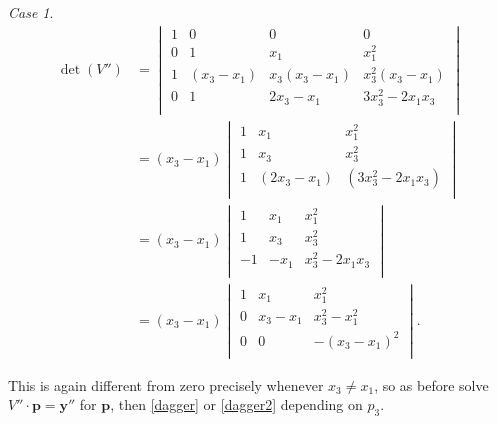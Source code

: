 \documentclass[english,11pt,a4paper]{article}
\theoremstyle{definition}
\theoremstyle{remark}
\theoremstyle{case}
\newtheorem{case}{Case}
\begin{document}
\begin{case}
		\begin{align*}\det (V'') &= 
		\begin{vmatrix}
			1 & 0 & 0 & 0\\
			0 & 1 & x_1 & x_1^2\\
			1 & (x_3-x_1) & x_3(x_3-x_1) & x_3^2(x_3-x_1)\\
			0 & 1 & 2x_3 - x_1 & 3x_3^2-2x_1x_3\\
		\end{vmatrix}
		\\
		&= (x_3-x_1)
		\begin{vmatrix}
			1 & x_1 & x_1^2\\
			1 & x_3 & x_3^2\\
			1 & (2x_3 - x_1) & (3x_3^2-2x_1x_3)\\
		\end{vmatrix}
		\\
		&= (x_3-x_1)
		\begin{vmatrix}
			1 & x_1 & x_1^2\\
			1 & x_3 & x_3^2\\
			-1 & - x_1 & x_3^2-2x_1 x_3\\
		\end{vmatrix}
		\\		
		&= (x_3-x_1)
		\begin{vmatrix}
			1 & x_1 & x_1^2\\
			0 & x_3-x_1 & x_3^2-x_1^2\\
			0 & 0 & -(x_3-x_1)^2\\
		\end{vmatrix}.
	\end{align*}

	This is again different from zero precisely whenever $x_3 \neq x_1$, so as before solve $V'' \cdot \mathbf{p} = \mathbf{y''}$ for $\mathbf{p}$, then \eqref{dagger} or \eqref{dagger2} depending on $p_3$.%
\end{case}
\end{document}
